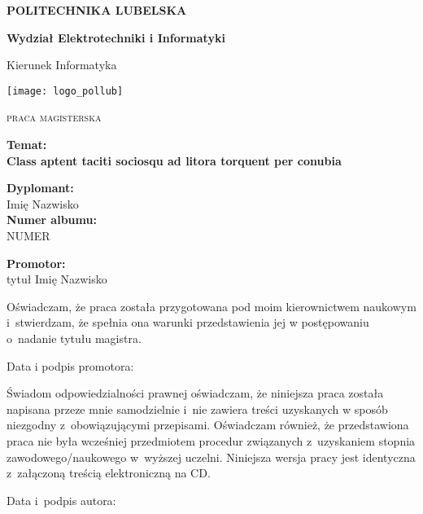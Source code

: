 \begin{titlepage}
\begin{center}

{\Huge\scshape \textbf{POLITECHNIKA LUBELSKA}}
\vspace{0.8cm}

{\LARGE \textbf{Wydział Elektrotechniki i Informatyki}}
\vspace{0.8cm}

{\LARGE Kierunek Informatyka}
\vspace{1cm}


\texttt{[image: logo\_pollub]}
\vspace{1.25cm}

{\LARGE\scshape praca magisterska}
\vfill

\textbf{Temat:}\\
\large\textbf{Class aptent taciti sociosqu ad litora torquent per conubia}
\end{center}
\vspace{2cm}

\begin{minipage}{0.6\textwidth}
    \textbf{Dyplomant:}\\
    Imię Nazwisko\\
    \textbf{Numer albumu:}\\
    NUMER
\end{minipage}
\begin{minipage}{0.3\textwidth}
    \textbf{Promotor:} \\
    tytuł Imię Nazwisko
\end{minipage}
 

\end{titlepage}

\cleardoublepage\thispagestyle{plain}
\vspace*{\fill}
Oświadczam, że praca została przygotowana pod moim kierownictwem naukowym
i~stwierdzam, że spełnia ona warunki przedstawienia jej w postępowaniu o~nadanie
tytułu magistra.

\bigskip Data i podpis promotora:
\vspace{5cm}

Świadom odpowiedzialności prawnej oświadczam, że niniejsza praca została napisana
przeze mnie samodzielnie i~nie zawiera treści uzyskanych w sposób niezgodny z~obowiązującymi
 przepisami. Oświadczam również, że przedstawiona praca nie była
wcześniej przedmiotem procedur związanych z~uzyskaniem stopnia
zawodowego/naukowego w~wyższej uczelni. Niniejsza wersja pracy jest identyczna z~załączoną
treścią elektroniczną na CD.

\bigskip Data i~podpis autora:

\vspace*{\fill}

\cleardoublepage\thispagestyle{plain}
\tableofcontents
